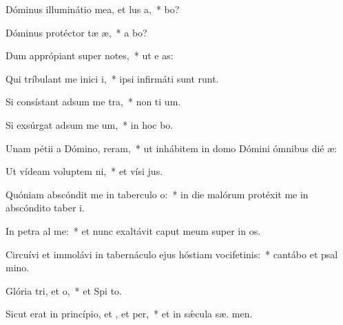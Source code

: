 \item Dóminus illuminátio mea, et lus a,~*  bo?
\item Dóminus protéctor tæ æ,~* a  bo?
\item Dum apprópiant super  notes,~* ut e  as:
\item Qui tríbulant me inici i,~* ipsi infirmáti sunt  runt.
\item Si consístant adsum me tra,~* non ti  um.
\item Si exsúrgat adsum me um,~* in hoc  bo.
\item Unam pétii a Dómino,  reram,~* ut inhábitem in domo Dómini ómnibus dié  æ:
\item Ut vídeam voluptem ni,~* et vísi  jus.
\item Quóniam abscóndit me in taberculo o:~* in die malórum protéxit me in abscóndito taber i.
\item In petra al me:~* et nunc exaltávit caput meum super in os.
\item Circuívi et immolávi in tabernáculo ejus hóstiam vocifetinis:~* cantábo et psal  mino.
\item Glória tri, et o,~* et Spi to.
\item Sicut erat in princípio, et , et per,~* et in sǽcula sæ. men.
